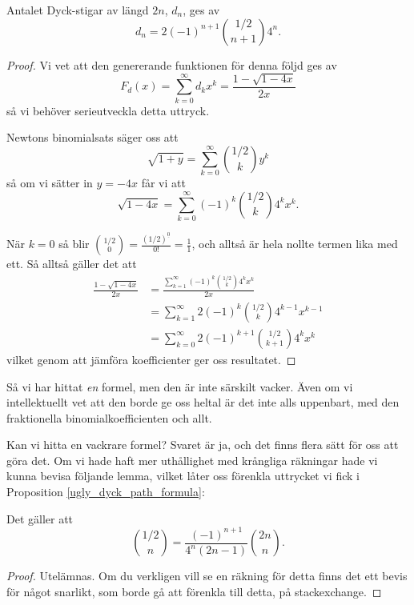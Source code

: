 \documentclass{tufte-handout}
\begin{document}
\begin{proposition}\label{ugly_dyck_path_formula}
    Antalet Dyck-stigar av längd $2n$, $d_n$, ges av
    $$d_n = 2 (-1)^{n+1}\binom{1/2}{n+1} 4^n.$$

    \begin{proof}
        Vi vet att den genererande funktionen för denna följd ges av
        $$F_d(x) = \sum_{k=0}^{\infty} d_k x^k = \frac{1 - \sqrt{1 - 4x}}{2x}$$
        så vi behöver serieutveckla detta uttryck.

        Newtons binomialsats säger oss att
        $$\sqrt{1 + y} = \sum_{k=0}^{\infty} \binom{1/2}{k} y^k$$
        så om vi sätter in $y = -4x$ får vi att
        $$\sqrt{1 - 4x} = \sum_{k=0}^{\infty} (-1)^k \binom{1/2}{k} 4^k x^k.$$
        
        När $k=0$ så blir $\binom{1/2}{0} = \frac{(1/2)^{\underline{0}}}{0!} = \frac{1}{1}$, och alltså är hela nollte termen lika med ett. Så alltså gäller det att
        \begin{align*}
            \frac{1 - \sqrt{1 - 4x}}{2x} &= \frac{\sum_{k=1}^{\infty} (-1)^k \binom{1/2}{k} 4^k x^k}{2x}\\
            &= \sum_{k=1}^{\infty} 2(-1)^k \binom{1/2}{k} 4^{k-1} x^{k-1}\\
            &= \sum_{k=0}^{\infty} 2 (-1)^{k+1}\binom{1/2}{k+1} 4^k x^k
        \end{align*}
        vilket genom att jämföra koefficienter ger oss resultatet.
    \end{proof}
\end{proposition}

Så vi har hittat \emph{en} formel, men den är inte särskilt vacker. Även om vi intellektuellt vet att den borde ge oss heltal är det inte alls uppenbart, med den fraktionella binomialkoefficienten och allt.

Kan vi hitta en vackrare formel? Svaret är ja, och det finns flera sätt för oss att göra det. Om vi hade haft mer uthållighet med krångliga räkningar hade vi kunna bevisa följande lemma, vilket låter oss förenkla uttrycket vi fick i Proposition \ref{ugly_dyck_path_formula}:

\begin{lemma}\label{lemma_onehalf_binom_coeff}
    Det gäller att
    $$\binom{1/2}{n} = \frac{(-1)^{n+1}}{4^n(2n-1)}\binom{2n}{n}.$$
    \begin{proof}
        Utelämnas. Om du verkligen vill se en räkning för detta finns det ett bevis för något snarlikt, som borde gå att förenkla till detta, på stackexchange.\cite{dyck_path_stackexchange}
    \end{proof}
\end{lemma}
\end{document}
